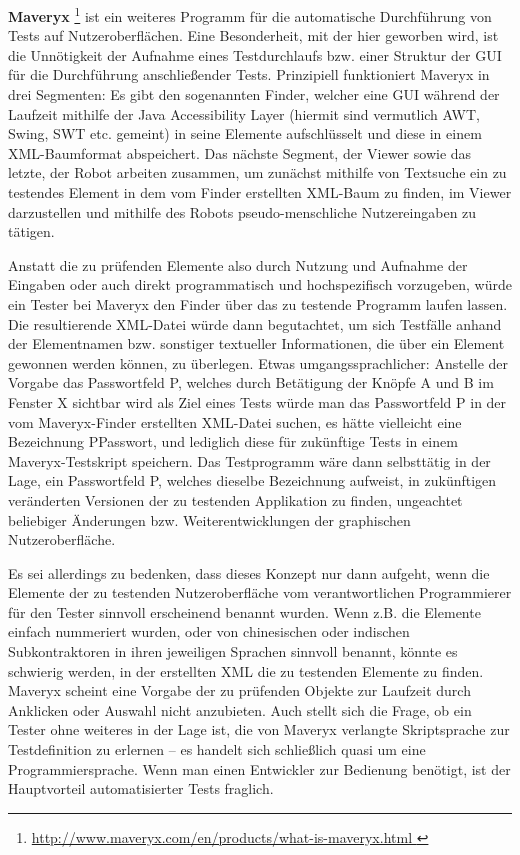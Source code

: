 \textbf{Maveryx} \footnote{\url{ http://www.maveryx.com/en/products/what-is-maveryx.html }} 
ist ein weiteres Programm für die automatische Durchführung von Tests auf Nutzeroberflächen.
Eine Besonderheit, mit der hier geworben wird, ist die Unnötigkeit der Aufnahme
eines Testdurchlaufs bzw. einer Struktur der GUI für die Durchführung anschließender
Tests. Prinzipiell funktioniert Maveryx in drei Segmenten: Es gibt den sogenannten
\glqq{}Finder\grqq{}, welcher eine GUI während der Laufzeit mithilfe der
\glqq{}Java Accessibility Layer\grqq{} (hiermit sind vermutlich AWT, Swing, SWT etc. gemeint)
in seine Elemente aufschlüsselt und diese in einem XML-Baumformat abspeichert.
Das nächste Segment, der \glqq{}Viewer\grqq{} sowie das letzte, der \glqq{}Robot\grqq{}
arbeiten zusammen, um zunächst mithilfe von Textsuche ein zu testendes Element in
dem vom Finder erstellten XML-Baum zu finden, im Viewer darzustellen und mithilfe
des Robots pseudo-menschliche Nutzereingaben zu tätigen.

Anstatt die zu prüfenden Elemente also durch Nutzung und Aufnahme der Eingaben
oder auch direkt programmatisch und hochspezifisch vorzugeben, würde ein Tester bei
Maveryx den Finder über das zu testende Programm laufen lassen. Die resultierende
XML-Datei würde dann begutachtet, um sich Testfälle anhand der Elementnamen bzw. sonstiger
textueller Informationen, die über ein Element gewonnen werden können, zu überlegen.
Etwas umgangssprachlicher: Anstelle der Vorgabe \glqq{}das Passwortfeld P, welches
durch Betätigung der Knöpfe A und B im Fenster X sichtbar wird\grqq{} als Ziel
eines Tests würde man das Passwortfeld P in der vom Maveryx-Finder erstellten
XML-Datei suchen, es hätte vielleicht eine Bezeichnung \glqq{}PPasswort\grqq{},
und lediglich diese für zukünftige Tests in einem Maveryx-Testskript speichern.
Das Testprogramm wäre dann selbsttätig in der Lage, ein Passwortfeld P,
welches dieselbe Bezeichnung aufweist, in zukünftigen veränderten Versionen
der zu testenden Applikation zu finden, ungeachtet beliebiger Änderungen bzw.
Weiterentwicklungen der graphischen Nutzeroberfläche.

Es sei allerdings zu bedenken, dass dieses Konzept nur dann aufgeht, wenn
die Elemente der zu testenden Nutzeroberfläche vom verantwortlichen Programmierer
für den Tester sinnvoll erscheinend benannt wurden. Wenn z.B. die Elemente
einfach nummeriert wurden, oder von chinesischen oder indischen Subkontraktoren
in ihren jeweiligen Sprachen sinnvoll benannt, könnte es schwierig werden,
in der erstellten XML die zu testenden Elemente zu finden. Maveryx scheint
eine Vorgabe der zu prüfenden Objekte zur Laufzeit durch Anklicken oder
Auswahl nicht anzubieten. Auch stellt sich die Frage, ob ein Tester ohne weiteres
in der Lage ist, die von Maveryx verlangte Skriptsprache zur Testdefinition
zu erlernen -- es handelt sich schließlich quasi um eine Programmiersprache.
Wenn man einen Entwickler zur Bedienung benötigt, ist der Hauptvorteil
automatisierter Tests fraglich.

